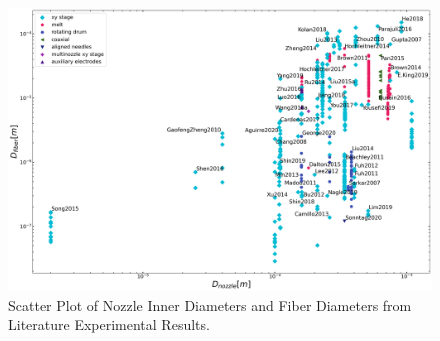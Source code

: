 \begin{figure}[!th]
\centering
\includegraphics[width=\textwidth]{./Figures/plt_Dnozzlem_vs_Dfiberm.png}
\decoRule
\caption[Scatter Plot of Nozzle Inner Diameters and Fiber Diameters from Literature Experimental Results]{Scatter Plot of Nozzle Inner Diameters and Fiber Diameters from Literature Experimental Results. \cite{
  Yang2019,Fattahi2017,Shin2019,Wang2015,Parajuli2016,Zheng2010,Fuh2011,Dalton2015,
  Ru2014,Xue2014,Wang2017,Xu2014,Liu2013,Pan2014,Canton2014,Chakraborty2009,Gupta2007,
  He2018,Zhou2011,Chen2013,Williams2018,Choi2017,Pan2019,Lei2015,Lim2019,Park2020,
  Fuh2012,Flores2017,Chang2010,Xu2019,Zhang2019,Shin2018,Fuh2015,Nagle2019,Zheng2012,
  Kameoka2003a,Liu2014,E.King2019,Hochleitner2017,Madou2011,Jiang2018,Husain2016,
  ElectrospinTech2015,Brown2011,Kolan2018,Chang2011,Beachley2011,Camillo2013,Kameoka2003,
  Bu2012,Lee2012,Huang2015,Coppola2020,CisquellaSerra2019,Ruggieri2013,Hochleitner2014,
  Zhu2016,Brown2014,Chang2008,Sonntag2020,Kim2018,Deng2020,Han2019,George2020,Sun2006a,
  Pan2015,Shen2016,Strauss2019,Fuh2013,Sarkar2007,You2017,Wang2018a,Zheng2014,Song2015,
  GaofengZheng2010,Liu2015a,Min2013,Luo2016,Yousefi2019,Cardenas2017,Coppola2014}}
\label{fig:plt_Dnozzlem_vs_Dfiberm}
\end{figure}

